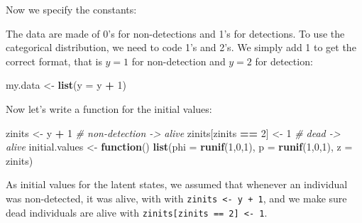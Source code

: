 \documentclass[
  12pt,
]{krantz}
\newenvironment{Shaded}{\begin{snugshade}}{\end{snugshade}}
\newcommand{\AttributeTok}[1]{\textcolor[rgb]{0.13,0.29,0.53}{#1}}
\newcommand{\CommentTok}[1]{\textcolor[rgb]{0.56,0.35,0.01}{\textit{#1}}}
\newcommand{\ControlFlowTok}[1]{\textcolor[rgb]{0.13,0.29,0.53}{\textbf{#1}}}
\newcommand{\DecValTok}[1]{\textcolor[rgb]{0.00,0.00,0.81}{#1}}
\newcommand{\DocumentationTok}[1]{\textcolor[rgb]{0.56,0.35,0.01}{\textbf{\textit{#1}}}}
\newcommand{\FunctionTok}[1]{\textcolor[rgb]{0.13,0.29,0.53}{\textbf{#1}}}
\newcommand{\NormalTok}[1]{#1}
\newcommand{\OtherTok}[1]{\textcolor[rgb]{0.56,0.35,0.01}{#1}}
\newcommand{\SpecialCharTok}[1]{\textcolor[rgb]{0.81,0.36,0.00}{\textbf{#1}}}
\begin{document}
Now we specify the constants:

\begin{Shaded}
\end{Shaded}

The data are made of 0's for non-detections and 1's for detections. To use the categorical distribution, we need to code 1's and 2's. We simply add 1 to get the correct format, that is \(y = 1\) for non-detection and \(y = 2\) for detection:

\begin{Shaded}
\begin{Highlighting}[]
\NormalTok{my.data }\OtherTok{\textless{}{-}} \FunctionTok{list}\NormalTok{(}\AttributeTok{y =}\NormalTok{ y }\SpecialCharTok{+} \DecValTok{1}\NormalTok{)}
\end{Highlighting}
\end{Shaded}

Now let's write a function for the initial values:

\begin{Shaded}
\begin{Highlighting}[]
\NormalTok{zinits }\OtherTok{\textless{}{-}}\NormalTok{ y }\SpecialCharTok{+} \DecValTok{1} \CommentTok{\# non{-}detection {-}\textgreater{} alive}
\NormalTok{zinits[zinits }\SpecialCharTok{==} \DecValTok{2}\NormalTok{] }\OtherTok{\textless{}{-}} \DecValTok{1} \CommentTok{\# dead {-}\textgreater{} alive}
\NormalTok{initial.values }\OtherTok{\textless{}{-}} \ControlFlowTok{function}\NormalTok{() }\FunctionTok{list}\NormalTok{(}\AttributeTok{phi =} \FunctionTok{runif}\NormalTok{(}\DecValTok{1}\NormalTok{,}\DecValTok{0}\NormalTok{,}\DecValTok{1}\NormalTok{),}
                                  \AttributeTok{p =} \FunctionTok{runif}\NormalTok{(}\DecValTok{1}\NormalTok{,}\DecValTok{0}\NormalTok{,}\DecValTok{1}\NormalTok{),}
                                  \AttributeTok{z =}\NormalTok{ zinits)}
\end{Highlighting}
\end{Shaded}

As initial values for the latent states, we assumed that whenever an individual was non-detected, it was alive, with with \texttt{zinits\ \textless{}-\ y\ +\ 1}, and we make sure dead individuals are alive with \texttt{zinits{[}zinits\ ==\ 2{]}\ \textless{}-\ 1}.
\end{document}
